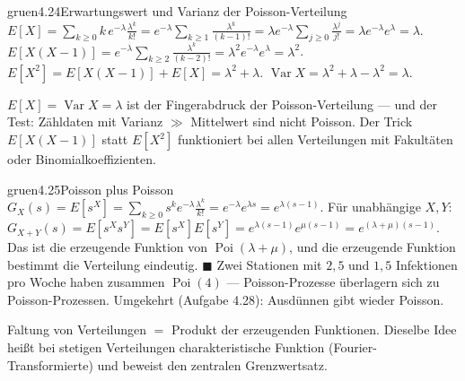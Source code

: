 \begin{loesungkarte}{gruen}{4.24}{Erwartungswert und Varianz der Poisson-Verteilung}
$E[X] = \sum_{k\ge0}k\,e^{-\lambda}\frac{\lambda^{k}}{k!} = e^{-\lambda}\sum_{k\ge1}\frac{\lambda^{k}}{(k - 1)!} = \lambda e^{-\lambda}\sum_{j\ge0}\frac{\lambda^{j}}{j!} = \lambda e^{-\lambda}e^{\lambda} = \lambda$.
$E[X(X - 1)] = e^{-\lambda}\sum_{k\ge2}\frac{\lambda^{k}}{(k - 2)!} = \lambda^{2}e^{-\lambda}e^{\lambda} = \lambda^{2}$.
$E[X^{2}] = E[X(X - 1)] + E[X] = \lambda^{2} + \lambda$. $\operatorname{Var}X = \lambda^{2} + \lambda - \lambda^{2} = \lambda$.
\begin{mitnehmen}\kastentext
$E[X] = \operatorname{Var}X = \lambda$ ist der Fingerabdruck der Poisson-Verteilung --- und der Test: Zähldaten mit Varianz $\gg$ Mittelwert sind nicht Poisson. Der Trick $E[X(X - 1)]$ statt $E[X^{2}]$ funktioniert bei allen Verteilungen mit Fakultäten oder Binomialkoeffizienten.
\end{mitnehmen}
\end{loesungkarte}

\begin{loesungkarte}{gruen}{4.25}{Poisson plus Poisson}
$G_X(s) = E[s^{X}] = \sum_{k\ge0}s^{k}e^{-\lambda}\frac{\lambda^{k}}{k!} = e^{-\lambda}e^{\lambda s} = e^{\lambda(s - 1)}$.
Für unabhängige $X, Y$: $G_{X+Y}(s) = E[s^{X}s^{Y}] = E[s^{X}]E[s^{Y}] = e^{\lambda(s - 1)}e^{\mu(s - 1)} = e^{(\lambda + \mu)(s - 1)}$.
Das ist die erzeugende Funktion von $\operatorname{Poi}(\lambda + \mu)$, und die erzeugende Funktion bestimmt die Verteilung eindeutig. $\blacksquare$
Zwei Stationen mit $2{,}5$ und $1{,}5$ Infektionen pro Woche haben zusammen $\operatorname{Poi}(4)$ --- Poisson-Prozesse überlagern sich zu Poisson-Prozessen. Umgekehrt (Aufgabe 4.28): Ausdünnen gibt wieder Poisson.
\begin{mitnehmen}\kastentext
Faltung von Verteilungen $=$ Produkt der erzeugenden Funktionen. Dieselbe Idee heißt bei stetigen Verteilungen charakteristische Funktion (Fourier-Transformierte) und beweist den zentralen Grenzwertsatz.
\end{mitnehmen}
\end{loesungkarte}

